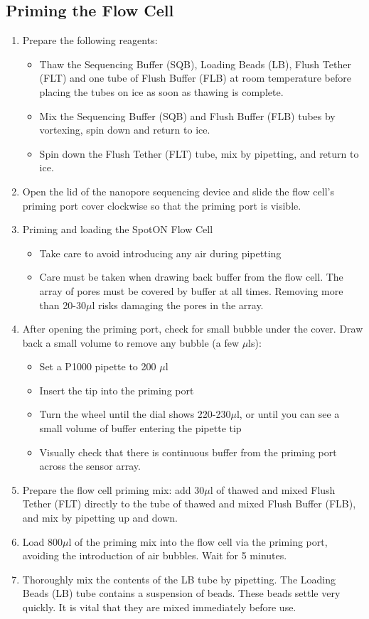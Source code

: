\subsection{Priming the Flow Cell}
\begin{enumerate}
	\item Prepare the following reagents:
	\begin{itemize}
		\item Thaw the Sequencing Buffer (SQB), Loading Beads (LB), Flush Tether (FLT) and one tube of Flush Buffer (FLB) at room temperature before placing the tubes on ice as soon as thawing is complete.
		\item Mix the Sequencing Buffer (SQB) and Flush Buffer (FLB) tubes by vortexing, spin down and return to ice.
		\item Spin down the Flush Tether (FLT) tube, mix by pipetting, and return to ice.
	\end{itemize}
	\item Open the lid of the nanopore sequencing device and slide the flow cell's priming port cover clockwise so that the priming port is visible.
	\item Priming and loading the SpotON Flow Cell
	\begin{itemize}
		\item Take care to avoid introducing any air during pipetting
		\item Care must be taken when drawing back buffer from the flow cell. The array of pores must be covered by buffer at all times. Removing more than 20-30$\mu$l risks damaging the pores in the array.
	\end{itemize}
	\item After opening the priming port, check for small bubble under the cover. Draw back a small volume to remove any bubble (a few $\mu$ls):
	\begin{itemize}
		\item Set a P1000 pipette to 200 $\mu$l
		\item Insert the tip into the priming port
		\item Turn the wheel until the dial shows 220-230$\mu$l, or until you can see a small volume of buffer entering the pipette tip
		\item Visually check that there is continuous buffer from the priming port across the sensor array.
	\end{itemize}
	\item Prepare the flow cell priming mix: add 30$\mu$l of thawed and mixed Flush Tether (FLT) directly to the tube of thawed and mixed Flush Buffer (FLB), and mix by pipetting up and down.
	\item Load 800$\mu$l of the priming mix into the flow cell via the priming port, avoiding the introduction of air bubbles. Wait for 5 minutes.
	\item Thoroughly mix the contents of the LB tube by pipetting. The Loading Beads (LB) tube contains a suspension of beads. These beads settle very quickly. It is vital that they are mixed immediately before use.
\end{enumerate}

